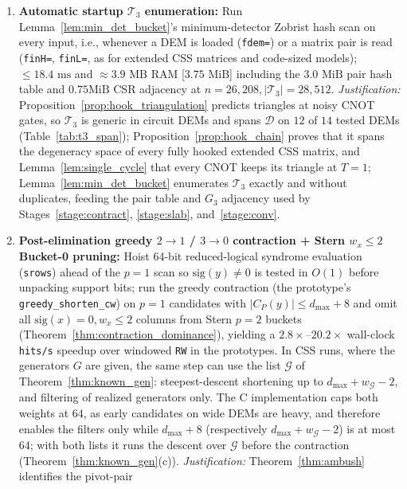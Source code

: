 \documentclass[12pt]{article}
\theoremstyle{definition}
\newcommand{\Dc}{\mathcal{D}}
\newcommand{\Tc}{\mathcal{T}_3}
\newcommand{\Gc}{\mathcal{G}}
\newcommand{\ttt}[1]{\texttt{#1}}
\begin{document}
\begin{enumerate}[label=\textbf{Stage~\arabic*.}, ref=\arabic*, wide=0pt]
  \item\label{stage:enum} \textbf{Automatic startup $\Tc$ enumeration:} Run Lemma~\ref{lem:min_det_bucket}'s
    minimum-detector Zobrist hash scan on every input, i.e., whenever a DEM is loaded (\ttt{fdem=}) or a matrix pair
    is read (\ttt{finH=}, \ttt{finL=}, as for extended CSS matrices and code-sized models); $\le 18.4\text{ ms}$ and
    $\approx 3.9\text{ MB}$ RAM [$3.75\text{ MiB}$] including the $3.0\text{ MiB}$ pair hash table and $0.75\text{
    MiB}$ CSR adjacency at $n = 26{,}208, |\Tc| = 28{,}512$. \emph{Justification:}
    Proposition~\ref{prop:hook_triangulation} predicts triangles at noisy CNOT gates, so $\Tc$ is generic in circuit
    DEMs and spans $\Dc$ on $12$ of $14$ tested DEMs (Table~\ref{tab:t3_span}); Proposition~\ref{prop:hook_chain}
    proves that it spans the degeneracy space of every fully hooked extended CSS matrix, and
    Lemma~\ref{lem:single_cycle} that every CNOT keeps its triangle at $T = 1$; Lemma~\ref{lem:min_det_bucket}
    enumerates $\Tc$ exactly and without duplicates, feeding the pair table and $G_3$ adjacency used by
    Stages~\ref{stage:contract}, \ref{stage:slab}, and~\ref{stage:conv}.
  \item\label{stage:contract} \textbf{Post-elimination greedy $2 \to 1$ / $3 \to 0$ contraction + Stern $w_x \le 2$
    Bucket-0 pruning:} Hoist 64-bit reduced-logical syndrome evaluation (\ttt{srows}) ahead of the $p = 1$ scan so
    $\mathrm{sig}(y) \neq 0$ is tested in $O(1)$ before unpacking support bits; run the greedy contraction (the
    prototype's \ttt{greedy\_shorten\_cw}) on $p
    = 1$ candidates with $|C_P(y)| \le d_{\max} + 8$ and omit all $\mathrm{sig}(x) = 0, w_x \le 2$ columns from
    Stern $p = 2$ buckets (Theorem~\ref{thm:contraction_dominance}), yielding a $2.8\times$--$20.2\times$ wall-clock
    \ttt{hits/s} speedup over windowed \ttt{RW} in the prototypes. In CSS runs, where the generators $G$ are given, the
    same step can use the list $\Gc$ of Theorem~\ref{thm:known_gen}: steepest-descent shortening up to $d_{\max} +
    w_{\Gc} - 2$, and filtering of realized generators only. The C implementation caps both weights at $64$, as early
    candidates on wide DEMs are heavy, and therefore enables the filters only while $d_{\max} + 8$ (respectively
    $d_{\max} + w_{\Gc} - 2$) is at most $64$; with both lists it runs the descent over $\Gc$ before the contraction
    (Theorem~\ref{thm:known_gen}(c)). \emph{Justification:} Theorem~\ref{thm:ambush} identifies the pivot-pair

\end{enumerate}
\end{document}
